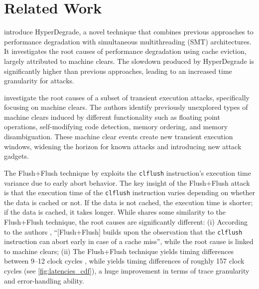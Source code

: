 \section{Related Work}
\label{sec:related}

%
\citet{2022:hd} introduce HyperDegrade, a novel technique that combines previous
approaches to performance degradation with simultaneous multithreading (SMT)
architectures. It investigates the root causes of performance degradation using
cache eviction, largely attributed to machine clears. The slowdown produced by
HyperDegrade is significantly higher than previous approaches, leading to an
increased time granularity for \FR{} attacks.

%
\citet{2021:rage} investigate the root causes of a subset of transient execution
attacks, specifically focusing on machine clears. The authors identify previously
unexplored types of machine clears induced by different functionality such as
floating point operations, self-modifying code detection, memory ordering, and
memory disambiguation. These machine clear events create new transient execution
windows, widening the horizon for known attacks and introducing new attack
gadgets.

%
The Flush+\-Flush technique by \citet{2016:flfl}
exploits the \texttt{clflush} instruction's
execution time variance due to early abort behavior.
%
The key insight of the Flush+\-Flush attack is that the execution time of the
\texttt{clflush} instruction varies depending on whether the data is cached or
not. If the data is not cached, the execution time is shorter; if the data is
cached, it takes longer. While \MCHAMMER{} shares some similarity to the
Flush+\-Flush technique, the root causes are significantly different:
(i) According to the authors \cite[Section~3]{2016:flfl},
      ``[Flush+\-Flush] builds upon the observation that the \texttt{clflush}
      instruction can abort early in case of a cache miss'',
      while the \MCHAMMER{} root cause is linked to machine clears;
(ii) The Flush+Flush technique yields timing differences between 9--12 clock
      cycles \cite[Figure~1]{2016:flfl}, while \MCHAMMER{} yields timing differences
      of roughly 157 clock cycles (see \autoref{fig:latencies_cdf}),
      a huge improvement in terms of trace granularity and error-handling ability.
